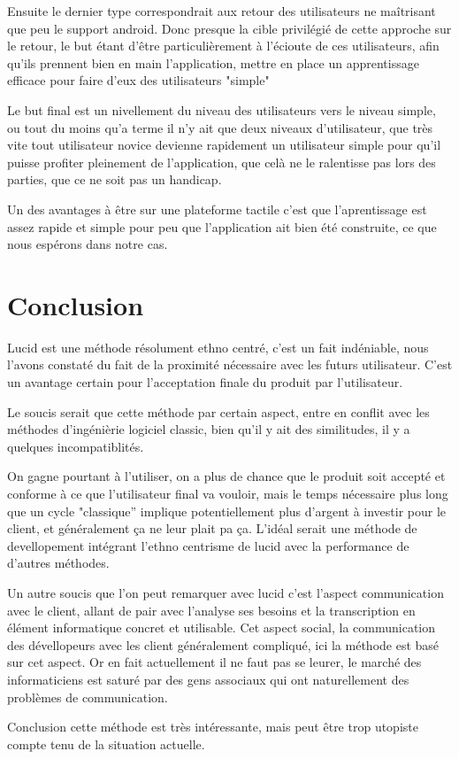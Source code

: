 \documentclass[11pt,a4paper]{article}
\begin{document}
Ensuite le dernier type correspondrait aux retour des utilisateurs ne maîtrisant que peu le support
android. Donc presque la cible privilégié de cette approche sur le retour, le but étant d'être particulièrement
à l'écioute de ces utilisateurs, afin qu'ils prennent bien en main l'application, mettre en place un apprentissage
efficace pour faire d'eux des utilisateurs "simple" 

Le but final est un nivellement du niveau des utilisateurs vers le niveau simple, ou tout du moins 
qu'a terme il n'y ait que deux niveaux d'utilisateur, que très vite tout utilisateur novice devienne rapidement
un utilisateur simple pour qu'il puisse profiter pleinement de l'application, que celà ne le ralentisse pas lors 
des parties, que ce ne soit pas un handicap.

Un des avantages à être sur une plateforme tactile c'est que l'aprentissage est assez rapide et simple
pour peu que l'application ait bien été construite, ce que nous espérons dans notre cas.


\section{Conclusion}

Lucid est une méthode résolument ethno centré, c'est un fait indéniable, nous l'avons constaté
du fait de la proximité nécessaire avec les futurs utilisateur. C'est un avantage certain pour 
l'acceptation finale du produit par l'utilisateur. 

Le soucis serait que cette méthode par certain aspect, entre en conflit avec les méthodes
d'ingénièrie logiciel classic, bien qu'il y ait des similitudes, il y a quelques incompatiblités.

On gagne pourtant à l'utiliser, on a  plus de chance que le produit soit accepté et
conforme à ce que l'utilisateur final va vouloir, mais le temps nécessaire plus
long que un cycle "classique'' implique potentiellement plus d'argent à investir
pour le client, et généralement ça ne leur plait pa ça. L'idéal serait une méthode de devellopement 
intégrant l'ethno centrisme de lucid avec la performance de d'autres méthodes.

Un autre soucis que l'on peut remarquer avec lucid c'est l'aspect communication avec le client,
allant de pair avec l'analyse ses besoins et la transcription en élément informatique concret et utilisable.
Cet aspect social, la communication des dévellopeurs avec les client généralement compliqué, ici la méthode 
est basé sur cet aspect. Or en fait actuellement il ne faut pas se leurer, le marché des informaticiens
est saturé par des gens associaux qui ont naturellement des problèmes de communication.

Conclusion cette méthode est très intéressante, mais peut être trop utopiste compte tenu 
de la situation actuelle.

  
  
\end{document}

